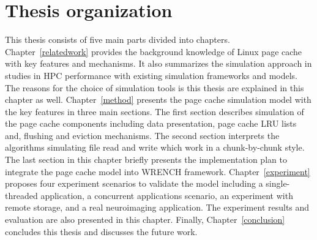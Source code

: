 \section{Thesis organization}
This thesis consists of five main parts divided into chapters.
Chapter~\ref{relatedwork} provides the background knowledge of Linux page cache 
with key features and mechanisms. 
It also summarizes the simulation approach in studies in HPC performance with 
existing simulation frameworks and models. 
The reasons for the choice of simulation tools is this thesis are explained in this 
chapter as well.
Chapter~\ref{method} presents the page cache simulation model with the key features 
in three main sections.
The first section describes simulation of the page cache components including data 
presentation, page cache LRU lists and, flushing and eviction mechanisms.
The second section interprets the algorithms simulating file read and write which work 
in a chunk-by-chunk style.
The last section in this chapter briefly presents the implementation plan to integrate 
the page cache model into WRENCH framework.
Chapter~\ref{experiment} proposes four experiment scenarios to validate the model
including a single-threaded application, a concurrent applications scenario, 
an experiment with remote storage, and a real neuroimaging application. 
The experiment results and evaluation are also presented in this chapter. 
Finally, Chapter~\ref{conclusion} concludes this thesis and discusses the future work. 


